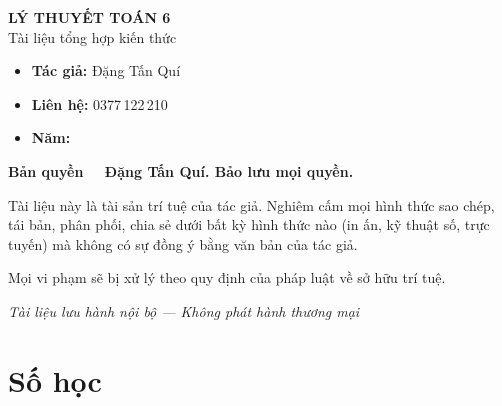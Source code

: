 \documentclass[12pt,a4paper]{article}
\begin{document}
\newpage

\thispagestyle{empty}
\vspace*{5cm}
\begin{center}
  {\Large\bfseries LÝ THUYẾT TOÁN 6}\\[8pt]
  {\large Tài liệu tổng hợp kiến thức}
\end{center}

\vspace{2cm}

\begin{tcolorbox}[
  enhanced, colback=red!3!white, colframe=red!60!black,
  fonttitle=\bfseries, title={Thông tin bản quyền},
  boxrule=1.5pt
]
  \begin{itemize}[leftmargin=*]
    \item \textbf{Tác giả:} Đặng Tấn Quí
    \item \textbf{Liên hệ:} 0377\,122\,210
    \item \textbf{Năm:} \the\year
  \end{itemize}

  \vspace{8pt}
  \textbf{Bản quyền \textcopyright\ \the\year\ Đặng Tấn Quí. Bảo lưu mọi quyền.}

  \vspace{6pt}
  Tài liệu này là tài sản trí tuệ của tác giả. Nghiêm cấm mọi hình thức sao chép, tái bản, phân phối, chia sẻ dưới bất kỳ hình thức nào (in ấn, kỹ thuật số, trực tuyến) mà không có sự đồng ý bằng văn bản của tác giả.

  \vspace{6pt}
  Mọi vi phạm sẽ bị xử lý theo quy định của pháp luật về sở hữu trí tuệ.
\end{tcolorbox}

\vfill
\begin{center}
  \small\textit{Tài liệu lưu hành nội bộ --- Không phát hành thương mại}
\end{center}

\newpage

\tableofcontents
\newpage

\section{Số học}
\end{document}
